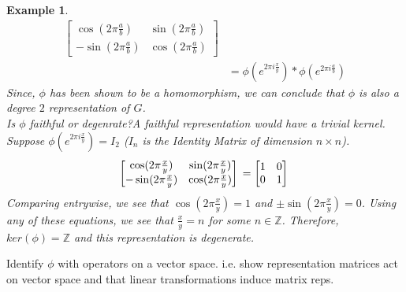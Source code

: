 \documentclass[10pt]{ucthesis}
\newtheorem{example}[definition]{Example}
\begin{document}
\begin{example}
\begin{equation}
\begin{aligned}
											  		  \begin{bmatrix}
														\cos(2\pi\frac{a}{b}) & \sin(2\pi\frac{a}{b}) \\
														-\sin(2\pi\frac{a}{b}) & \cos(2\pi\frac{a}{b})
													  \end{bmatrix} \\
		                                                                                    &= \phi(e^{2\pi i\frac{x}{y}})*\phi(e^{2\pi i\frac{a}{b}})
		\end{aligned}
	\end{equation}
	Since, $\phi$ has been shown to be a homomorphism, we can conclude that $\phi$ is also a degree $2$ representation of $G$.\\

	\noindent Is $\phi$ faithful or degenrate?A faithful representation would have a trivial kernel. Suppose $\phi(e^{2\pi i\frac{x}{y}}) = I_2$ ($I_n$ is the Identity Matrix of dimension $n\times n$). 
	\begin{equation}
			\begin{bmatrix}
				\cos(2\pi\frac{x}{y}) & \sin(2\pi\frac{x}{y}) \\
				-\sin(2\pi\frac{x}{y}) & \cos(2\pi\frac{x}{y})
			\end{bmatrix}\\
			= \begin{bmatrix}
				1 & 0 \\
				0 & 1 \\
			\end{bmatrix}\\
	\end{equation}
	\noindent Comparing entrywise, we see that $\cos(2\pi\frac{x}{y}) = 1$ and $\pm\sin(2\pi\frac{x}{y}) = 0$. Using any of these equations, we see that $\frac{x}{y}= n$ for some $n\in\mathbb{Z}$. Therefore, $ker(\phi)=\mathbb{Z}$ and this representation is degenerate.


\end{example}

Identify $\phi$ with operators on a vector space.
i.e. show representation matrices act on vector space and that linear transformations induce matrix reps.\\\\



\end{document}

